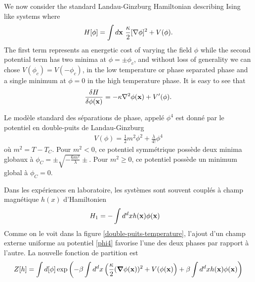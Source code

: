 We now consider the standard Landau-Ginzburg Hamiltonian describing Ising like systems where
\begin{equation}
    H[\phi] = \int d{\bf x} \ \frac{\kappa}{2}[\nabla \phi]^2 + V(\phi) .
\end{equation}
The first term represents an energetic cost of varying the field $\phi$ while the second potential term has two minima at $\phi=\pm \phi_c$, and without loss of generality we can chose  $V(\phi_c)=V(-\phi_c)$, in the low temperature or phase separated phase and a single minimum at $\phi=0$ in the high temperature phase. 
It is easy to see that 
\begin{equation}
    \frac{\delta H}{\delta \phi({\bf x})} = -\kappa \nabla^2 \phi({\bf x}) + V'(\phi).
    \label{cm}
\end{equation}


Le modèle standard des séparations de phase, appelé $\phi^4$ est donné par le potentiel en double-puits de Landau-Ginzburg \cite[§ 45]{l_landau_physique_1990} 
\begin{align}
    V(\phi) = \frac{1}{2} m^2 \phi^2 + \frac{\lambda}{4!} \phi^4
    \label{phi4}
\end{align} 
où $m^2 = T-T_C$. Pour $m^2 \less 0$, ce potentiel symmétrique possède deux minima globaux à $\phi_C = \pm \sqrt{- \frac{6 m^2}{\lambda} } \pm$. Pour $m^2 \ge 0$, ce potentiel possède un minimum global à $\phi_C = 0$. 

Dans les expériences en laboratoire, les systèmes sont souvent couplés à champ magnétique $h(x)$ d'Hamiltonien
\begin{align}
    H_1 &= - \int d^dx h({\bf x})\phi({\bf x})
    \label{champ-externe}
\end{align}
Comme on le voit dans la figure \ref{double-puits-temperature}, l'ajout d'un champ externe uniforme au potentiel \ref{phi4} favorise l'une des deux phases par rapport à l'autre. La nouvelle fonction de partition est
\begin{align}
    Z[h] = \int d [\phi] \exp \left( - \beta \int d^d x \left( \frac{\kappa}{2} ({\boldsymbol \nabla} \phi({\bf x}))^2 + V(\phi({\bf x}) \right) + \beta \int d^d x h({\bf x}) \phi({\bf x}) \right)
\end{align}

